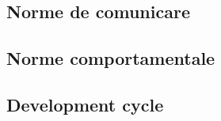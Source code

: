 \subsection{Norme de comunicare}

\subsection{Norme comportamentale}


\subsection{Development cycle}


